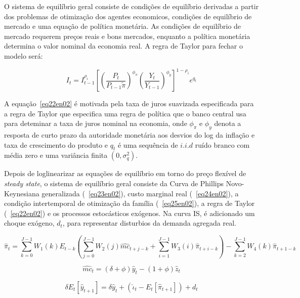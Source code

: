 \documentclass[twoside,a4paper,11pt]{report}
\begin{document}
{{O sistema de equilíbrio geral consiste de condições de equilíbrio derivadas a partir dos problemas de otimização dos agentes economicos, condições de equilíbrio de mercado e uma equação de política monetária. As condições de equilíbrio de mercado requerem preços reais e bons mercados, enquanto a política monetária determina o valor nominal da economia real. A regra de Taylor para fechar o modelo será:

\begin{equation}\label{eq22en02}
{I}_{t}={I}_{t-1}^{{\rho}_{i}}{[{(\frac{{P}_{t}}{{P}_{t-1}\tilde{\pi}})}^{{\phi}_{\pi}}{(\frac{{Y}_{t}}{{Y}_{t-1}})}^{{\phi}_{y}} ]}^{1-{\rho}_{i}}{e}^{{q}_{t}}
\end{equation}

A equação~\ref{eq22en02} é motivada pela taxa de juros suavizada especificada para a regra de Taylor que especifica uma regra de política que o banco central usa para deteminar a taxa de juros nominal na economia, onde ${\phi}_{\pi}$ e ${\phi}_{y}$ denota a resposta de curto prazo da autoridade monetária aos desvios do log da inflação e taxa de crescimento do produto e $q_{t}$ é uma sequência de $i.i.d$ ruído branco com média zero e uma variância finita $(0,{\sigma}_{q}^{2})$. 

Depois de loglinearizar as equações de equilíbrio em torno do preço flexível de \emph{steady state}, o sistema de equilíbrio geral consiste da Curva de Phillips Novo-Keynesiana generalizada (~\ref{eq23en02}), custo marginal real (~\ref{eq24en02}), a condição intertemporal de otimização da família (~\ref{eq25en02}), a regra de Taylor (~\ref{eq22en02}) e os processos estocásticos exógenos. Na curva IS, é adicionado um choque exógeno, $d_{t}$, para representar disturbios da demanda agregada real.

\begin{equation}\label{eq23en02}
{\hat{\pi}}_{t}=\sum_{k=0}^{J-1}{{W}_{1}(k)}{E}_{t-k}(\sum_{j=0}^{J-1}{{W}_{2}(j){\hat{mc}}_{t+j-k}+\sum_{i=1}^{J-1}{{W}_{3}(i){\hat{\pi}}_{t+i-k}}})-\sum_{k=2}^{J-1}{{W}_{4}(k){\hat{\pi}}_{t+1-k}} 
\end{equation}

\begin{equation}\label{eq24en02}
{\hat{mc}}_{t}=(\delta +\phi){\hat{y}}_{t}-(1+\phi){\hat{z}}_{t}
\end{equation}

\begin{equation}\label{eq25en02}
\delta{E}_{t}[{\hat{y}}_{t+1}]=\delta{\hat{y}}_{t}+({\hat{\iota}}_{t}-{E}_{t}[{\hat{\pi}}_{t+1}])+{d}_{t}
\end{equation}

}}
\end{document}
